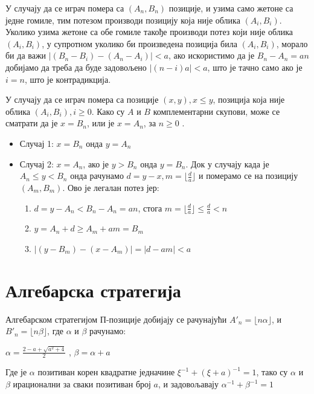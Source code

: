 \documentclass[a4paper]{article}
\begin{document}
У случају да се играч помера са $ (A_{n}, B_{n}) $ позиције, и узима само жетоне са једне гомиле, тим потезом производи позицију која није облика $ (A_{i}, B_{i}) $. Уколико узима жетоне са обе гомиле такође производи потез који није облика $ (A_{i}, B_{i}) $, у супротном уколико би произведена позиција била $ (A_{i}, B_{i}) $, морало би да важи $ |(B_{n} - B_{i}) - (A_{n}-A_{i})| < a $, ако искористимо да је $ B_{n} - A_{n} = an $ добијамо да треба да буде задовољено $ |(n-i)a| < a $, што је тачно само ако је $ i = n $, што је контрадикција. 

У случају да се играч помера са позиције $ (x, y), x \le y $, позиција која није облика $ (A_{i}, B_{i}), i \ge 0 $. Како су $ A $ и $ B $ комплементарни скупови, може се сматрати да је $ x = B_{n} $, или је $ x = A_{n} $, за $ n \ge 0 $ .
\begin{itemize}
	\item Случај 1: $ x = B_{n} $ онда $ y = A_{n} $
	\item Случај 2: $ x = A_{n} $, ако је $ y > B_{n} $ онда $ y = B_{n} $. Док у случају када је $ A_{n} \le y < B_{n} $ онда рачунамо $ d = y - x, m = \lfloor \frac{d}{a} \rfloor $ и померамо се на позицију $ (A_{m}, B_{m}) $. Ово је легалан потез јер:
		\begin{enumerate}
			\item $ d = y - A_{n} < B_{n} - A_{n} = an $, стога $ m = \lfloor \frac{d}{a} \rfloor \le \frac{d}{a} < n $
			\item $ y = A_{n} + d \ge A_{m} + am = B_m $
			\item $ |(y - B_{m}) - (x - A_{m})| = |d - am| < a $
		\end{enumerate}
\end{itemize}

\section{Алгебарска стратегија}
\label{sec:algebarska_strategija}

Алгебарском стратегијом П-позиције добијају се рачунајући $ A'_{n} = \lfloor n\alpha \rfloor $, и $ B'_{n} = \lfloor n\beta \rfloor $, где $ \alpha $ и $ \beta $ рачунамо:  
\begin{center}
	$ \alpha = \frac{2 - a + \sqrt{a^2 + 4}}{2} $ , $ \beta = \alpha + a $ 
\end{center}
Где је $ \alpha $ позитиван корен квадратне једначине $ \xi^{-1} + (\xi+a)^{-1} = 1 $, тако су $ \alpha $ и $ \beta $ ирационални за сваки позитиван број $ a $, и задовољавају $ \alpha^{-1} + \beta^{-1} = 1 $
\end{document}
